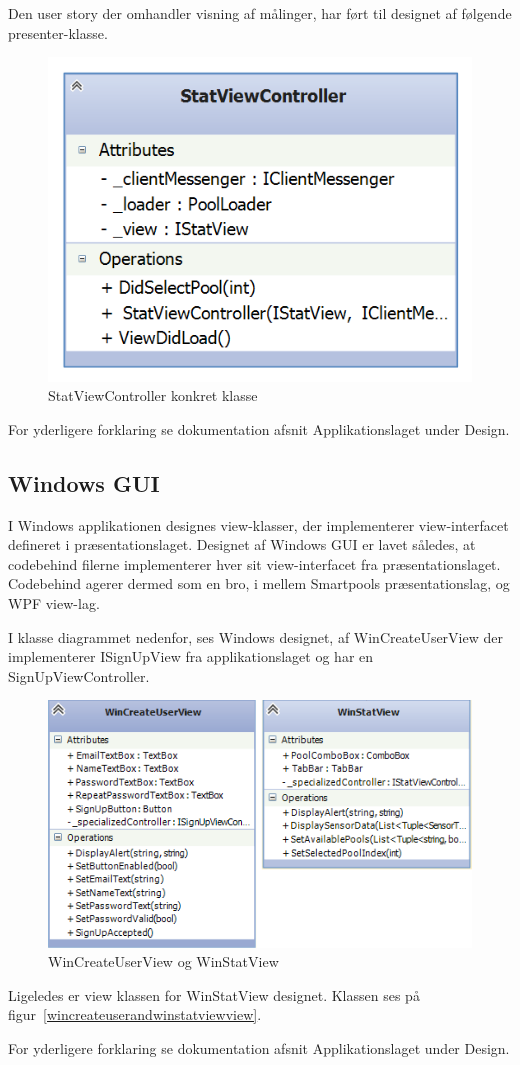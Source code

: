 Den user story der omhandler visning af målinger, har ført til designet af følgende presenter-klasse.

\begin{figure}
\centering
\includegraphics[width=0.35\linewidth]{figs/design/application_statviewcontroller}
\caption{StatViewController konkret klasse}
\label{fig:application_statviewcontroller}
\end{figure}

For yderligere forklaring se dokumentation afsnit Applikationslaget under Design.

\subsection{Windows GUI}
I Windows applikationen designes view-klasser, der implementerer view-interfacet defineret i præsentationslaget.
Designet af Windows GUI er lavet således, at codebehind filerne implementerer hver sit view-interfacet fra præsentationslaget. Codebehind agerer dermed som en bro, i mellem Smartpools præsentationslag, og WPF view-lag.

I klasse diagrammet nedenfor, ses Windows designet, af WinCreateUserView der implementerer ISignUpView fra applikationslaget og har en SignUpViewController.
\begin{figure}
\centering
\includegraphics[width=0.7\linewidth]{figs/design/wincreateuserandwinstatviewview}
\caption{WinCreateUserView og WinStatView}
\label{fig:wincreateuserandwinstatviewview}
\end{figure}

Ligeledes er view klassen for WinStatView designet.
Klassen ses på figur~\ref{wincreateuserandwinstatviewview}.

For yderligere forklaring se dokumentation afsnit Applikationslaget under Design.